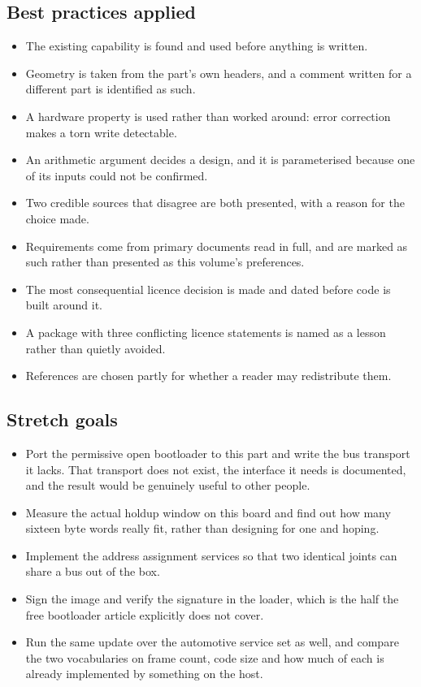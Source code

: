 \subsection*{Best practices applied}

\begin{itemize}
\item The existing capability is found and used before anything is written.
\item Geometry is taken from the part's own headers, and a comment written for a
different part is identified as such.
\item A hardware property is used rather than worked around: error correction
makes a torn write detectable.
\item An arithmetic argument decides a design, and it is parameterised because
one of its inputs could not be confirmed.
\item Two credible sources that disagree are both presented, with a reason for
the choice made.
\item Requirements come from primary documents read in full, and are marked as
such rather than presented as this volume's preferences.
\item The most consequential licence decision is made and dated before code is
built around it.
\item A package with three conflicting licence statements is named as a lesson
rather than quietly avoided.
\item References are chosen partly for whether a reader may redistribute them.
\end{itemize}

\subsection*{Stretch goals}

\begin{itemize}
\item Port the permissive open bootloader to this part and write the bus
transport it lacks. That transport does not exist, the interface it needs is
documented, and the result would be genuinely useful to other people.
\item Measure the actual holdup window on this board and find out how many
sixteen byte words really fit, rather than designing for one and hoping.
\item Implement the address assignment services so that two identical joints can
share a bus out of the box.
\item Sign the image and verify the signature in the loader, which is the half
the free bootloader article explicitly does not cover.
\item Run the same update over the automotive service set as well, and compare
the two vocabularies on frame count, code size and how much of each is already
implemented by something on the host.
\end{itemize}


